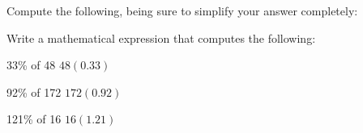 \documentclass[12pt,letterpaper]{exam}
\begin{document}
\begin{questions}



\newpage



\question[8] Compute the following, being sure to simplify your answer completely: \pspace
{}



\newpage



\question[6] Write a mathematical expression that computes the following: \pspace
\begin{parts}
\item 33\% of 48 \hspace{4.5cm} $48(0.33)$ \vfill
\item 92\% of 172 \hspace{4.2cm} $172(0.92)$ \vfill
\item 121\% of 16 \hspace{4.2cm} $16(1.21)$ \vfill
\end{parts} \vfill




\end{questions}
\end{document}
